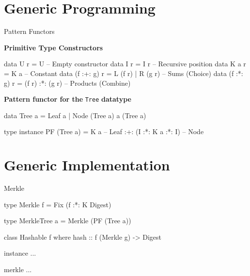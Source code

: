 \section{Generic Programming}

\begin{slide}{Pattern Functors}

\textbf{Primitive Type Constructors}

\begin{haskell}
data U r         = U                 -- Empty constructor
data I r         = I r               -- Recursive position
data K a r       = K a               -- Constant
data (f :+: g) r = L (f r) | R (g r) -- Sums (Choice)
data (f :*: g) r = (f r) :*: (g r)   -- Products (Combine)
\end{haskell}

\textbf{Pattern functor for the} \texttt{Tree} \textbf{datatype}

\begin{haskell}
data Tree a = Leaf a | Node (Tree a) a (Tree a)

type instance PF (Tree a) = K a                -- Leaf
                         :+: (I :*: K a :*: I) -- Node
\end{haskell}
\end{slide}


  





\section{Generic Implementation}

\begin{slide}{Merkle}
\begin{haskell}
type Merkle f = Fix (f :*: K Digest)

type MerkleTree a = Merkle (PF (Tree a))

class Hashable f where
  hash :: f (Merkle g) -> Digest

instance ...

merkle ...
\end{haskell}
\end{slide}